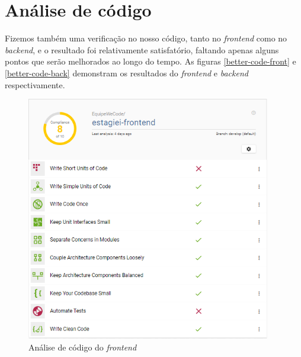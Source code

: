 \section{Análise de código}
Fizemos também uma verificação no nosso código, tanto no \textit{\gls{frontend}} como no \textit{\gls{backend}}, e o resultado foi relativamente satisfatório, faltando apenas alguns pontos que serão melhorados ao longo do tempo. As figuras \autoref{better-code-front} e \autoref{better-code-back} demonstram os resultados do \textit{\gls{frontend}} e \textit{\gls{backend}} respectivamente.

\begin{figure}[H]
	\centering
	\caption{\label{better-code-front}Análise de código do \textit{\gls{frontend}}}
	\includegraphics[width=0.95\textwidth]{../imagens/web-tests/better-code-front.png}
\end{figure}


